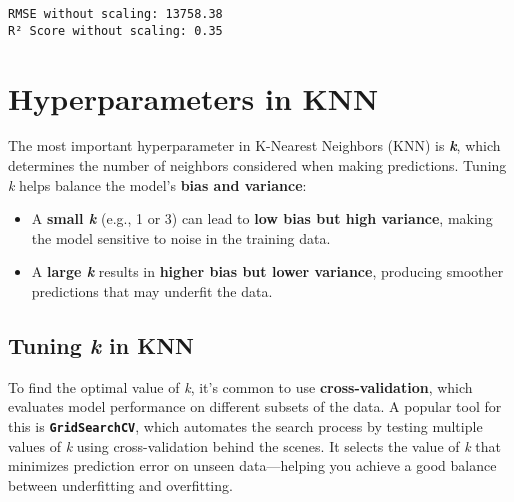 \documentclass[
  letterpaper,
  DIV=11,
  numbers=noendperiod]{scrreprt}
\providecommand{\tightlist}{%
  \setlength{\itemsep}{0pt}\setlength{\parskip}{0pt}}\usepackage{longtable,booktabs,array}
\begin{document}
\begin{verbatim}
RMSE without scaling: 13758.38
R² Score without scaling: 0.35
\end{verbatim}

\section{Hyperparameters in KNN}\label{hyperparameters-in-knn}

The most important hyperparameter in K-Nearest Neighbors (KNN) is
\textbf{\emph{k}}, which determines the number of neighbors considered
when making predictions. Tuning \emph{k} helps balance the model's
\textbf{bias and variance}:

\begin{itemize}
\tightlist
\item
  A \textbf{small \emph{k}} (e.g., 1 or 3) can lead to \textbf{low bias
  but high variance}, making the model sensitive to noise in the
  training data.
\item
  A \textbf{large \emph{k}} results in \textbf{higher bias but lower
  variance}, producing smoother predictions that may underfit the data.
\end{itemize}

\subsection{\texorpdfstring{Tuning \emph{k} in
KNN}{Tuning k in KNN}}\label{tuning-k-in-knn}

To find the optimal value of \emph{k}, it's common to use
\textbf{cross-validation}, which evaluates model performance on
different subsets of the data. A popular tool for this is
\textbf{\texttt{GridSearchCV}}, which automates the search process by
testing multiple values of \emph{k} using cross-validation behind the
scenes. It selects the value of \emph{k} that minimizes prediction error
on unseen data---helping you achieve a good balance between underfitting
and overfitting.
\end{document}

